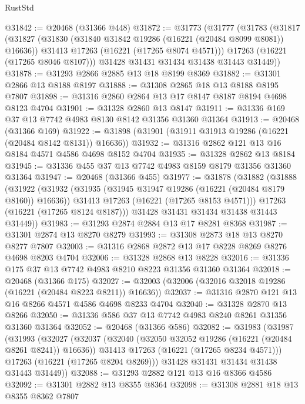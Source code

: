 \begin{lexlean}{RustStd}
\begin{coremodule}
@31842 := @20468 (@31366 @448)
@31872 := @31773
    (@31777
      (@31783
        (@31817
          (@31827
            (@31830 (@31840 @31842 @19286 (@16221 (@20484 @8099 @8081)) @16636))
            @31413
            @17263
            (@16221 (@17265 @8074 @4571)))
          @17263
          (@16221 (@17265 @8046 @8107)))
        @31428
        @31431
        @31434
        @31438
        @31443
        @31449))
@31878 := @31293 @2866 @2885 @13 @18 @8199 @8369
@31882 := @31301 @2866 @13 @8188 @8197
@31888 := @31308 @2865 @18 @13 @8188 @8195 @7807
@31898 := @31316 @2860 @2864 @13 @17 @8147 @8187 @8194 @4698 @8123 @4704
@31901 := @31328 @2860 @13 @8147
@31911 := @31336 @169 @37 @13 @7742 @4983 @8130 @8142 @31356 @31360 @31364
@31913 := @20468 (@31366 @169)
@31922 := @31898 (@31901 (@31911 @31913 @19286 (@16221 (@20484 @8142 @8131)) @16636))
@31932 := @31316 @2862 @121 @13 @16 @8184 @4571 @4586 @4698 @8152 @4704
@31935 := @31328 @2862 @13 @8184
@31945 := @31336 @455 @37 @13 @7742 @4983 @8159 @8179 @31356 @31360 @31364
@31947 := @20468 (@31366 @455)
@31977 := @31878
    (@31882
      (@31888
        (@31922
          (@31932
            (@31935 (@31945 @31947 @19286 (@16221 (@20484 @8179 @8160)) @16636))
            @31413
            @17263
            (@16221 (@17265 @8153 @4571)))
          @17263
          (@16221 (@17265 @8124 @8187)))
        @31428
        @31431
        @31434
        @31438
        @31443
        @31449))
@31983 := @31293 @2874 @2884 @13 @17 @8281 @8368
@31987 := @31301 @2874 @13 @8270 @8279
@31993 := @31308 @2873 @18 @13 @8270 @8277 @7807
@32003 := @31316 @2868 @2872 @13 @17 @8228 @8269 @8276 @4698 @8203 @4704
@32006 := @31328 @2868 @13 @8228
@32016 := @31336 @175 @37 @13 @7742 @4983 @8210 @8223 @31356 @31360 @31364
@32018 := @20468 (@31366 @175)
@32027 := @32003 (@32006 (@32016 @32018 @19286 (@16221 (@20484 @8223 @8211)) @16636))
@32037 := @31316 @2870 @121 @13 @16 @8266 @4571 @4586 @4698 @8233 @4704
@32040 := @31328 @2870 @13 @8266
@32050 := @31336 @586 @37 @13 @7742 @4983 @8240 @8261 @31356 @31360 @31364
@32052 := @20468 (@31366 @586)
@32082 := @31983
    (@31987
      (@31993
        (@32027
          (@32037
            (@32040 (@32050 @32052 @19286 (@16221 (@20484 @8261 @8241)) @16636))
            @31413
            @17263
            (@16221 (@17265 @8234 @4571)))
          @17263
          (@16221 (@17265 @8204 @8269)))
        @31428
        @31431
        @31434
        @31438
        @31443
        @31449))
@32088 := @31293 @2882 @121 @13 @16 @8366 @4586
@32092 := @31301 @2882 @13 @8355 @8364
@32098 := @31308 @2881 @18 @13 @8355 @8362 @7807

\end{coremodule}
\end{lexlean}
